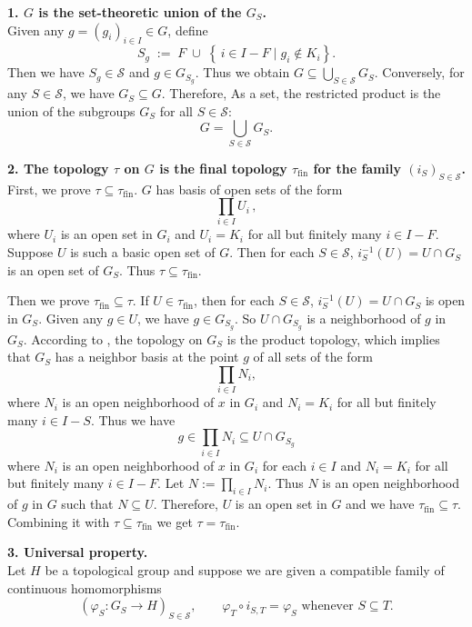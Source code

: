 \documentclass{report}
\begin{document}
\begin{prf}
	\noindent\textbf{1. $G$ is the set-theoretic union of the $G_S$.} \\
	Given any $g=(g_i)_{i\in I}\in G$, define
	\[
	S_g\;:=\;F\;\cup\;\left\{\,i\in I- F \mid g_i\notin K_i\right\}.
	\]
	Then we have $S_g \in \mathcal{S}$ and $g\in G_{S_g}$. Thus we obtain $G\subseteq \bigcup_{S\in \mathcal S} G_S$. Conversely, for any $S\in \mathcal{S}$, we have $G_S\subseteq G$. Therefore,
	As a set, the restricted product is the union of the subgroups \( G_S \) for all \( S \in \mathcal{S} \):
	\[
	   G=\bigcup_{S\in \mathcal S} G_S .
	\]
	
	\smallskip
	\noindent\textbf{2. The topology $\tau$ on $G$ is the final topology $\tau_{\mathrm{fin}}$ for the family
	$(i_S)_{S\in\mathcal S}$.} \\
	First, we prove $\tau\subseteq \tau_{\mathrm{fin}}$. $G$ has basis of open sets of the form
	\[
	\prod_{i\in I} U_i\,,
	\]
	where \( U_i \) is an open set in \( G_i \) and \( U_i = K_i \) for all but finitely many \( i \in I-F\). Suppose \( U \) is such a basic open set of $G$. Then for each $S \in \mathcal{S}$, $i^{-1}_S(U)=U\cap G_S$ is an open set of $G_S$. Thus $\tau \subseteq \tau_{\mathrm{fin}}$. 
	
	Then we prove $\tau_{\mathrm{fin}}\subseteq \tau$. If $U \in \tau_{\mathrm{fin}}$, then for each $S \in \mathcal{S}$, $i^{-1}_S(U)=U\cap G_S$ is open in $G_S$. Given any $g\in U$, we have $g\in G_{S_g}$. So $U\cap G_{S_g}$ is a neighborhood of $g$ in $G_S$. According to , the topology on $G_S$ is the product topology, which implies that $G_S$ has a neighbor basis at the point $g$ of all sets of the form
	\[
	\prod_{i\in I} N_i,
	\]
	where $N_i$ is an open neighborhood of $x$ in $G_i$ and $N_i=K_i$ for all but finitely many $i\in I-S$. Thus we have
	\[
	g \in \prod_{i\in I} N_i \subseteq U\cap G_{S_g}
	\]
	where $N_i$ is an open neighborhood of $x$ in $G_i$ for each $i\in I$ and $N_i=K_i$ for all but finitely many $i\in I-F$. Let $N:=\prod_{i\in I} N_i$. Thus $N$ is an open neighborhood of $g$ in $G$ such that $N \subseteq U$. Therefore, $U$ is an open set in $G$ and we have $\tau_{\mathrm{fin}}\subseteq \tau$. Combining it with $\tau \subseteq \tau_{\mathrm{fin}}$ we get $\tau =\tau_{\mathrm{fin}}$.

	\smallskip
\noindent\textbf{3. Universal property.}\\
Let $H$ be a topological group and suppose we are given a compatible
family of continuous homomorphisms
\[
  (\varphi_S\colon G_S\to H)_{S\in\mathcal S},
  \qquad
  \varphi_T\circ i_{S,T}=\varphi_S \text{ whenever }S\subseteq T.
\]


\end{prf}
\end{document}
